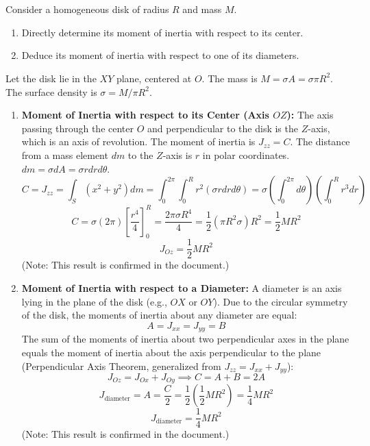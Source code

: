 \documentclass[12pt]{article}
\begin{document}
\section{}

Consider a homogeneous disk of radius $R$ and mass $M$.

\begin{enumerate}
    \item Directly determine its moment of inertia with respect to its center.
    \item Deduce its moment of inertia with respect to one of its diameters.
\end{enumerate}

\begin{correctionbox}
Let the disk lie in the $XY$ plane, centered at $O$. The mass is $M=\sigma A = \sigma \pi R^2$. The surface density is $\sigma = M/\pi R^2$.

\begin{enumerate}
    \item \textbf{Moment of Inertia with respect to its Center (Axis $OZ$):}
        The axis passing through the center $O$ and perpendicular to the disk is the $Z$-axis, which is an axis of revolution. The moment of inertia is $J_{zz}=C$.
        The distance from a mass element $dm$ to the $Z$-axis is $r$ in polar coordinates. $dm = \sigma dA = \sigma r dr d\theta$.
        $$C = J_{zz} = \int_{S}(x^2+y^2)dm = \int_0^{2\pi}\int_0^R r^2 (\sigma r dr d\theta) = \sigma \left(\int_0^{2\pi} d\theta\right) \left(\int_0^R r^3 dr\right)$$
        $$C = \sigma (2\pi) \left[\frac{r^4}{4}\right]_0^R = \frac{2\pi \sigma R^4}{4} = \frac{1}{2} (\pi R^2 \sigma) R^2 = \frac{1}{2} M R^2$$
        $$J_{Oz} = \frac{1}{2} M R^2$$
        (Note: This result is confirmed in the document.)
    \item \textbf{Moment of Inertia with respect to a Diameter:}
        A diameter is an axis lying in the plane of the disk (e.g., $OX$ or $OY$). Due to the circular symmetry of the disk, the moments of inertia about any diameter are equal:
        $$A = J_{xx} = J_{yy} = B$$
        The sum of the moments of inertia about two perpendicular axes in the plane equals the moment of inertia about the axis perpendicular to the plane (Perpendicular Axis Theorem, generalized from $J_{zz}=J_{xx}+J_{yy}$):
        $$J_{Oz} = J_{Ox} + J_{Oy} \implies C = A + B = 2A$$
        $$J_{\text{diameter}} = A = \frac{C}{2} = \frac{1}{2} \left(\frac{1}{2} M R^2\right) = \frac{1}{4} M R^2$$
        $$J_{\text{diameter}} = \frac{1}{4} M R^2$$
        (Note: This result is confirmed in the document.)
\end{enumerate}

\end{correctionbox}
\end{document}
